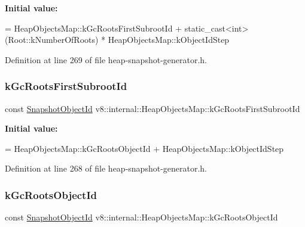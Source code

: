 {\bfseries Initial value\+:}
\begin{DoxyCode}
=
    HeapObjectsMap::kGcRootsFirstSubrootId +
    \textcolor{keyword}{static\_cast<}\textcolor{keywordtype}{int}\textcolor{keyword}{>}(Root::kNumberOfRoots) * HeapObjectsMap::kObjectIdStep
\end{DoxyCode}


Definition at line 269 of file heap-\/snapshot-\/generator.\+h.

\mbox{\label{classv8_1_1internal_1_1HeapObjectsMap_a1328bc87783492d376630e24758bbc69}} 
\subsubsection{\texorpdfstring{k\+Gc\+Roots\+First\+Subroot\+Id}{kGcRootsFirstSubrootId}}
{\footnotesize\ttfamily const \mbox{\hyperlink{classuint32__t}{Snapshot\+Object\+Id}} v8\+::internal\+::\+Heap\+Objects\+Map\+::k\+Gc\+Roots\+First\+Subroot\+Id\hspace{0.3cm}{\ttfamily [static]}}

{\bfseries Initial value\+:}
\begin{DoxyCode}
=
    HeapObjectsMap::kGcRootsObjectId + HeapObjectsMap::kObjectIdStep
\end{DoxyCode}


Definition at line 268 of file heap-\/snapshot-\/generator.\+h.

\mbox{\label{classv8_1_1internal_1_1HeapObjectsMap_abf649a7b9e771c6b8dbe9ef581d5eaac}} 
\subsubsection{\texorpdfstring{k\+Gc\+Roots\+Object\+Id}{kGcRootsObjectId}}
{\footnotesize\ttfamily const \mbox{\hyperlink{classuint32__t}{Snapshot\+Object\+Id}} v8\+::internal\+::\+Heap\+Objects\+Map\+::k\+Gc\+Roots\+Object\+Id\hspace{0.3cm}{\ttfamily [static]}}

